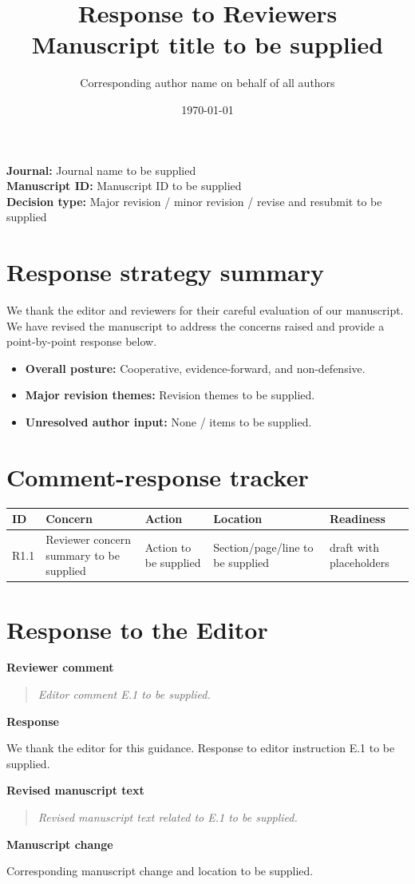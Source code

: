 \documentclass[11pt]{article}
\title{Response to Reviewers\\
\large Manuscript title to be supplied}
\author{Corresponding author name on behalf of all authors}
\date{\today}
\newcommand{\ReviewerComment}[1]{%
  \par\noindent\textbf{Reviewer comment}\par
  \begin{quote}\itshape #1\end{quote}
}
\newcommand{\AuthorResponse}[1]{%
  \par\noindent\textbf{Response}\par
  #1\par
}
\newcommand{\RevisedExcerpt}[1]{%
  \par\noindent\textbf{Revised manuscript text}\par
  \begin{quote}\itshape #1\end{quote}
}
\newcommand{\ManuscriptChange}[1]{%
  \par\noindent\textbf{Manuscript change}\par
  #1\par
}
\newcommand{\ReviewerSectionBreak}{\par\bigskip}
\newcommand{\EditorSection}{%
  \ReviewerSectionBreak
  \section*{Response to the Editor}
}
\begin{document}
\maketitle

\noindent\textbf{Journal:} Journal name to be supplied\\
\textbf{Manuscript ID:} Manuscript ID to be supplied\\
\textbf{Decision type:} Major revision / minor revision / revise and resubmit to be supplied

\section*{Response strategy summary}

We thank the editor and reviewers for their careful evaluation of our manuscript.
We have revised the manuscript to address the concerns raised and provide a
point-by-point response below.

\begin{itemize}[leftmargin=*]
  \item \textbf{Overall posture:} Cooperative, evidence-forward, and non-defensive.
  \item \textbf{Major revision themes:} Revision themes to be supplied.
  \item \textbf{Unresolved author input:} None / items to be supplied.
\end{itemize}

\section*{Comment-response tracker}

\begin{longtable}{>{\raggedright\arraybackslash}p{}
                  >{\raggedright\arraybackslash}p{}
                  >{\raggedright\arraybackslash}p{}
                  >{\raggedright\arraybackslash}p{}
                  >{\raggedright\arraybackslash}p{}}
\textbf{ID} & \textbf{Concern} & \textbf{Action} & \textbf{Location} & \textbf{Readiness}\\
\hline
R1.1 & Reviewer concern summary to be supplied & Action to be supplied & Section/page/line to be supplied & draft with placeholders\\
\end{longtable}

\EditorSection

\ReviewerComment{Editor comment E.1 to be supplied.}
\AuthorResponse{We thank the editor for this guidance. Response to editor instruction E.1 to be supplied.}
\RevisedExcerpt{Revised manuscript text related to E.1 to be supplied.}
\ManuscriptChange{Corresponding manuscript change and location to be supplied.}
\end{document}
